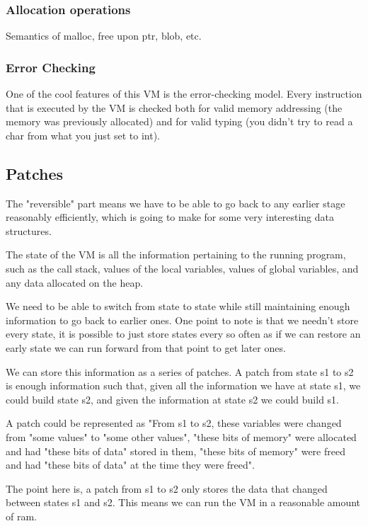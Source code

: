 \subsubsection{Allocation operations}
Semantics of malloc, free upon ptr, blob, etc.

\subsubsection{Error Checking}
One of the cool features of this VM is the error-checking model. Every instruction that is executed by the VM is checked both for valid memory addressing (the memory was previously allocated) and for valid typing (you didn't try to read a char from what you just set to int). 

\subsection{Patches}
The "reversible" part means we have to be able to go back to any earlier stage reasonably efficiently, which is going to make for some very interesting data structures.
\par
The state of the VM is all the information pertaining to the running program, such as the call stack, values of the local variables, values of global variables, and any data allocated on the heap.
\par
We need to be able to switch from state to state while still maintaining enough information to go back to earlier ones. One point to note is that we needn't store every state, it is possible to just store states every so often as if we can restore an early state we can run forward from that point to get later ones.
\par
We can store this information as a series of patches. A patch from state s1 to s2 is enough information such that, given all the information we have at state s1, we could build state s2, and given the information at state s2 we could build s1.
\par
A patch could be represented as "From s1 to s2, these variables were changed from "some values" to "some other values", "these bits of memory" were allocated and had "these bits of data" stored in them, "these bits of memory" were freed and had "these bits of data" at the time they were freed".
\par
The point here is, a patch from s1 to s2 only stores the data that changed between states s1 and s2. This means we can run the VM in a reasonable amount of ram.
\par
